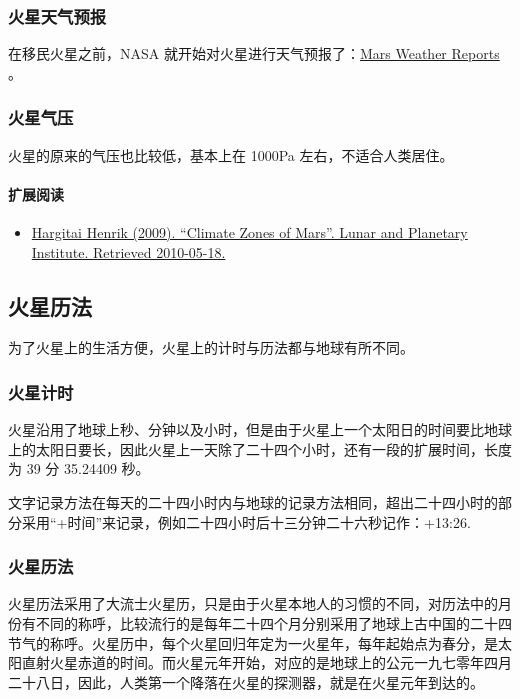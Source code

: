 \documentclass[letterpaper,10pt]{sphinxmanual}
\begin{document}
\subsubsection{火星天气预报}
\label{mars:id15}
在移民火星之前，NASA 就开始对火星进行天气预报了：\href{http://www.msss.com/msss\_images/subject/weather\_reports.html}{Mars Weather Reports} 。


\subsubsection{火星气压}
\label{mars:id16}
火星的原来的气压也比较低，基本上在 1000Pa 左右，不适合人类居住。
\begin{figure}[htbp]
\centering
\end{figure}


\paragraph{扩展阅读}
\label{mars:id18}\begin{itemize}
\item {} 
\href{http://www.lpi.usra.edu/meetings/lpsc2010/pdf/1199.pdf}{Hargitai Henrik (2009). ``Climate Zones of Mars''. Lunar and Planetary Institute. Retrieved 2010-05-18.}

\end{itemize}


\subsection{火星历法}
\label{mars:id19}
为了火星上的生活方便，火星上的计时与历法都与地球有所不同。


\subsubsection{火星计时}
\label{mars:id20}\label{mars:index-0}
火星沿用了地球上秒、分钟以及小时，但是由于火星上一个太阳日的时间要比地球上的太阳日要长，因此火星上一天除了二十四个小时，还有一段的扩展时间，长度为 39 分 35.24409 秒。

文字记录方法在每天的二十四小时内与地球的记录方法相同，超出二十四小时的部分采用“+时间”来记录，例如二十四小时后十三分钟二十六秒记作：+13:26.


\subsubsection{火星历法}
\label{mars:id21}\label{mars:index-1}
火星历法采用了大流士火星历，只是由于火星本地人的习惯的不同，对历法中的月份有不同的称呼，比较流行的是每年二十四个月分别采用了地球上古中国的二十四节气的称呼。火星历中，每个火星回归年定为一火星年，每年起始点为春分，是太阳直射火星赤道的时间。而火星元年开始，对应的是地球上的公元一九七零年四月二十八日，因此，人类第一个降落在火星的探测器，就是在火星元年到达的。
\end{document}
